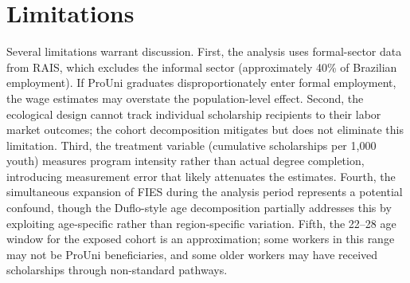 \section{Limitations}
\label{sec:limitations}

Several limitations warrant discussion. First, the analysis uses formal-sector data from RAIS, which excludes the informal sector (approximately 40\% of Brazilian employment). If ProUni graduates disproportionately enter formal employment, the wage estimates may overstate the population-level effect. Second, the ecological design cannot track individual scholarship recipients to their labor market outcomes; the cohort decomposition mitigates but does not eliminate this limitation. Third, the treatment variable (cumulative scholarships per 1,000 youth) measures program intensity rather than actual degree completion, introducing measurement error that likely attenuates the estimates. Fourth, the simultaneous expansion of FIES during the analysis period represents a potential confound, though the Duflo-style age decomposition partially addresses this by exploiting age-specific rather than region-specific variation. Fifth, the 22--28 age window for the exposed cohort is an approximation; some workers in this range may not be ProUni beneficiaries, and some older workers may have received scholarships through non-standard pathways.
